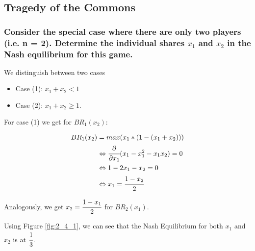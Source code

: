 
\subsection{Tragedy of the Commons}

\subsubsection{Consider the special case where there are only two players (i.e. n = 2). Determine the individual shares $x_1$ and $x_2$ in the Nash equilibrium for this game.}

We distinguish between two cases
\begin{itemize}
    \item Case (1): $x_1 + x_2 < 1$
    \item Case (2): $x_1 + x_2 \geq 1$.
\end{itemize} 
For case (1) we get for $BR_1(x_2)$:

\begin{equation}
    \begin{split}
        BR_1(x_2)&=max(x_1*(1 - (x_1 + x_2)))\\
        &\Leftrightarrow \cfrac{\partial}{\partial x_1}(x_1 - x_1^2 - x_1x_2)=0\\
        &\Leftrightarrow 1-2x_1-x_2=0\\
        &\Leftrightarrow x_1 = \cfrac{1-x_2}{2}\\
    \end{split}
\end{equation}

Analogously, we get $x_2 = \cfrac{1-x_1}{2}$ for $BR_2(x_1)$.

Using Figure \ref{fig:2_4_1}, we can see that the Nash Equilibrium for both $x_1$ and $x_2$ is at $\cfrac{1}{3}$.

